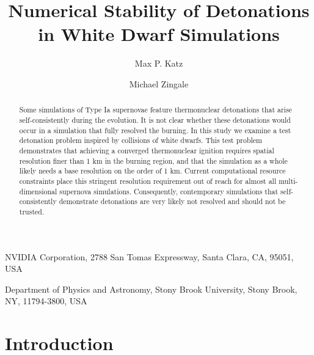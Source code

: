 \documentclass[twocolumn,numberedappendix]{../aastex62}
\begin{document}
\title{Numerical Stability of Detonations in White Dwarf Simulations}


\author{Max P. Katz}
\affiliation
{
  NVIDIA Corporation, 2788 San Tomas Expressway, Santa Clara, CA, 95051, USA
}

\author{Michael Zingale}
\affiliation
{
  Department of Physics and Astronomy, Stony Brook University, Stony Brook, NY, 11794-3800, USA
}



\begin{abstract}
Some simulations of Type Ia supernovae feature thermonuclear detonations that
arise self-consistently during the evolution. It is not clear whether these
detonations would occur in a simulation that fully resolved the burning. In this
study we examine a test detonation problem inspired by collisions of white dwarfs.
This test problem demonstrates that achieving a converged thermonuclear ignition
requires spatial resolution finer than 1 km in the burning region, and that
the simulation as a whole likely needs a base resolution on the order of 1 km.
Current computational resource constraints place this stringent resolution requirement
out of reach for almost all multi-dimensional supernova simulations.
Consequently, contemporary simulations that self-consistently demonstrate
detonations are very likely not resolved and should not be trusted.
\end{abstract}

\section{Introduction}
\label{sec:introduction}
\end{document}

